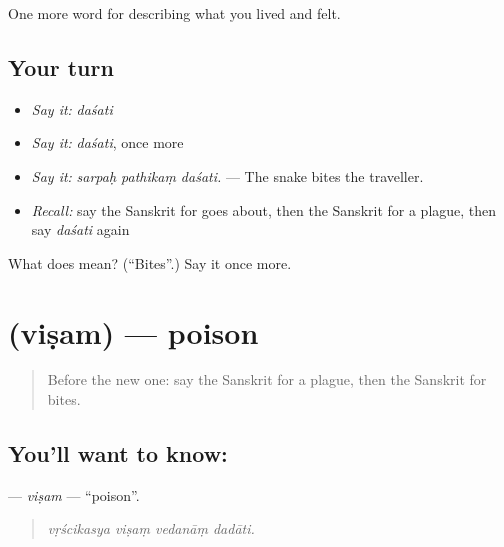 \begin{grammarlens}[title={What you've built}]
One more word for describing what you lived and felt.
\end{grammarlens}

\subsection*{Your turn}
\begin{itemize}
\raggedright
  \item \emph{Say it:} \emph{daśati}
  \item \emph{Say it:} \emph{daśati}, once more
  \item \emph{Say it:} \emph{sarpaḥ pathikaṃ daśati.} — The snake bites the traveller.
  \item \emph{Recall:} say the Sanskrit for goes about, then the Sanskrit for a plague, then say \emph{daśati} again
\end{itemize}

\begin{tcolorbox}[breakable,colback=teal!4,colframe=teal!35!black,title={Before you move on}]
What does  mean? (\textquotedblleft{}Bites\textquotedblright{}.) Say it once more.
\end{tcolorbox}
\section[\texorpdfstring{\sk{विषम्} (viṣam)}{विषम् (viṣam)}]{ (viṣam) — poison}

\label{lesson:SA-C480-visam}



\begin{quote}
Before the new one: say the Sanskrit for a plague, then the Sanskrit for bites.
\end{quote}

\subsection*{You'll want to know: }
\textbf{} — \emph{viṣam} — \textquotedblleft{}poison\textquotedblright{}.

\begin{quote}
   
\end{quote}

\begin{quote}
\emph{vṛścikasya viṣaṃ vedanāṃ dadāti.}
\end{quote}

